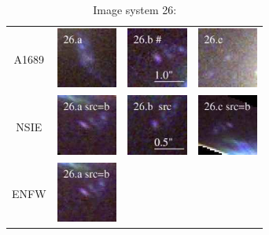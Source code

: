 \documentclass[useAMS,usenatbib]{mn2e}
\begin{document}
\begin{table}
  \caption{Image system 26:}\vspace{0mm}
  \begin{tabular}{cccc}
    \multicolumn{1}{m{1cm}}{{\Large A1689}}
    & \multicolumn{1}{m{1.7cm}}{\includegraphics[height=2.00cm,clip]{figs/nsie_img/rgb.img_26_a.ps}}
    & \multicolumn{1}{m{1.7cm}}{\includegraphics[height=2.00cm,clip]{figs/nsie_img/rgb.img_26_b.ps}}
    & \multicolumn{1}{m{1.7cm}}{\includegraphics[height=2.00cm,clip]{figs/nsie_img/rgb.img_26_c.ps}} \\
    \multicolumn{1}{m{1cm}}{{\Large NSIE}}
    & \multicolumn{1}{m{1.7cm}}{\includegraphics[height=2.00cm,clip]{figs/nsie_img/rgb.pre_26_a_b_tri.ps}}
    & \multicolumn{1}{m{1.7cm}}{\includegraphics[height=2.00cm,clip]{figs/nsie_img/rgb.src_26_b.ps}}
    & \multicolumn{1}{m{1.7cm}}{\includegraphics[height=2.00cm,clip]{figs/nsie_img/rgb.pre_26_c_b_tri.ps}} \\
    \multicolumn{1}{m{1cm}}{{\Large ENFW}}
    & \multicolumn{1}{m{1.7cm}}{\includegraphics[height=2.00cm,clip]{figs/enfw_img/rgb.pre_26_a_b_tri.ps}}

\end{tabular}
\end{table}
\end{document}
